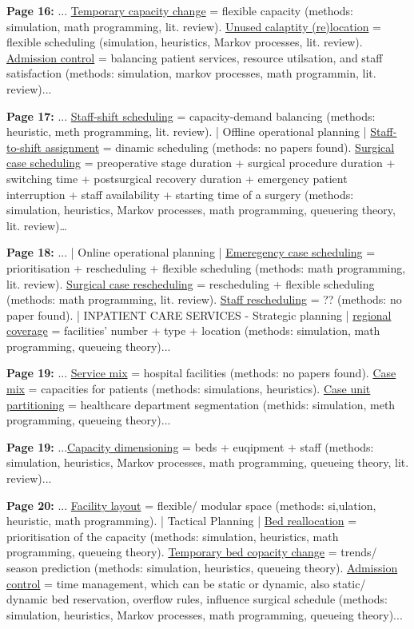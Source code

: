     \textbf{Page 16:}
    ... \underline{Temporary capacity change} = flexible capacity (methods: simulation, math programming, lit. review). \underline{Unused calaptity (re)location} = flexible scheduling (simulation, heuristics, Markov processes, lit. review). \underline{Admission control} = balancing patient services, resource utilsation, and staff satisfaction (methods: simulation, markov processes, math programmin, lit. review)...

    \textbf{Page 17:}
    ... \underline{Staff-shift scheduling} = capacity-demand balancing (methods: heuristic, meth programming, lit. review). | Offline operational planning | \underline{Staff-to-shift assignment} = dinamic scheduling (methods: no papers found). \underline{Surgical case scheduling} = preoperative stage duration + surgical procedure duration + switching time + postsurgical recovery duration + emergency patient interruption + staff availability + starting time of a surgery (methods: simulation, heuristics, Markov processes, math programming, queuering theory, lit. review)\dots
    
    \textbf{Page 18:}
    ... | Online operational planning | \underline{Emeregency case scheduling} = prioritisation + rescheduling + flexible scheduling (methods: math programming, lit. review). \underline{Surgical case rescheduling} = rescheduling + flexible scheduling (methods: math programming, lit. review). \underline{Staff rescheduling} = ?? (methods: no paper found). | INPATIENT CARE SERVICES - Strategic planning | \underline{regional coverage} = facilities' number + type + location (methods: simulation, math programming, queueing theory)...

    \textbf{Page 19:}
    ... \underline{Service mix} = hospital facilities (methods: no papers found). \underline{Case mix} = capacities for patients (methods: simulations, heuristics). \underline{Case unit partitioning} = healthcare department segmentation (methids: simulation, meth programming, queueing theory)... 
    
    \textbf{Page 19:}
    ...\underline{Capacity dimensioning} = beds + euqipment + staff (methods: simulation, heuristics, Markov processes, math programming, queueing theory, lit. review)... 
    
    \textbf{Page 20:}
    ... \underline{Facility layout} = flexible/ modular space (methods: si,ulation, heuristic, math programming). | Tactical Planning | \underline{Bed reallocation} = prioritisation of the capacity (methods: simulation, heuristics, math programming, queueing theory). \underline{Temporary bed copacity change} = trends/ season prediction (methods: simulation, heuristics, queueing theory). \underline{Admission control} = time management, which can be static or dynamic, also static/ dynamic bed reservation, overflow rules, influence surgical schedule (methods: simulation, heuristics, Markov processes, math programming, queueing theory)...
    
